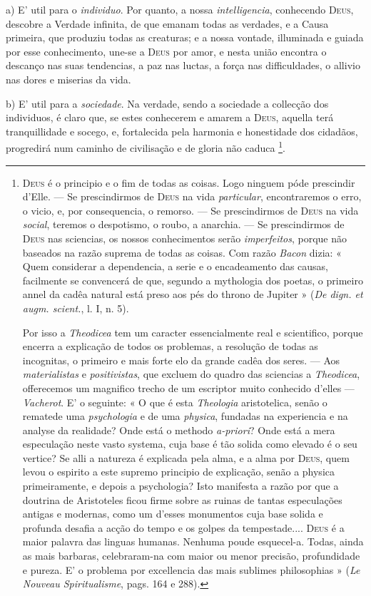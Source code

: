 a) E' util para o \emph{individuo}. Por quanto, a nossa \emph{intelligencia}, conhecendo \textsc{Deus}, descobre a Verdade infinita, de que emanam todas as verdades, e a Causa primeira, que produziu todas as creaturas; e a nossa vontade, illuminada e guiada por esse conhecimento, une-se a \textsc{Deus} por amor, e nesta união encontra o descanço nas suas tendencias, a paz nas luctas, a força nas difficuldades, o allivio nas dores e miserias da vida.

b) E' util para a \emph{sociedade}. Na verdade, sendo a sociedade a collecção dos individuos, é claro que, se estes conhecerem e amarem a \textsc{Deus}, aquella terá tranquillidade e socego, e, fortalecida pela harmonia e honestidade dos cidadãos, progredirá num caminho de civilisação e de gloria não caduca \footnote{\textsc{Deus} é o principio e o fim de todas as coisas. Logo ninguem póde prescindir d'Elle. --- Se prescindirmos de \textsc{Deus} na vida \emph{particular}, encontraremos o erro, o vicio, e, por consequencia, o remorso. --- Se prescindirmos de \textsc{Deus} na vida \emph{social}, teremos o despotismo, o roubo, a anarchia. --- Se prescindirmos de \textsc{Deus} nas sciencias, os nossos conhecimentos serão \emph{imperfeitos}, porque não baseados na razão suprema de todas as coisas. Com razão \emph{Bacon} dizia: « Quem considerar a dependencia, a serie e o encadeamento das causas, facilmente se convencerá de que, segundo a mythologia dos poetas, o primeiro annel da cadêa natural está preso aos pés do throno de Jupiter » (\emph{De dign. et augm. scient.}, l. I, n. 5).\par Por isso a \emph{Theodicea} tem um caracter essencialmente real e scientifico, porque encerra a explicação de todos os problemas, a resolução de todas as incognitas, o primeiro e mais forte elo da grande cadêa dos seres. --- Aos \emph{materialistas} e \emph{positivistas}, que excluem do quadro das sciencias a \emph{Theodicea}, offerecemos um magnifico trecho de um escriptor muito conhecido d'elles --- \emph{Vacherot}. E' o seguinte: « O que é esta \emph{Theologia} aristotelica, senão o rematede uma \emph{psychologia} e de uma \emph{physica}, fundadas na experiencia e na analyse da realidade? Onde está o methodo \emph{a-priori}? Onde está a mera especulação neste vasto systema, cuja base é tão solida como elevado é o seu vertice? Se alli a natureza é explicada pela alma, e a alma por \textsc{Deus}, quem levou o espirito a este supremo principio de explicação, senão a physica primeiramente, e depois a psychologia? Isto manifesta a razão por que a doutrina de Aristoteles ficou firme sobre as ruinas de tantas especulações antigas e modernas, como um d'esses monumentos cuja base solida e profunda desafia a acção do tempo e os golpes da tempestade.... \textsc{Deus} é a maior palavra das linguas humanas. Nenhuma poude esquecel-a. Todas, ainda as mais barbaras, celebraram-na com maior ou menor precisão, profundidade e pureza. E' o problema por excellencia das mais sublimes philosophias » (\emph{Le Nouveau Spiritualisme}, pags. 164 e 288).}.

